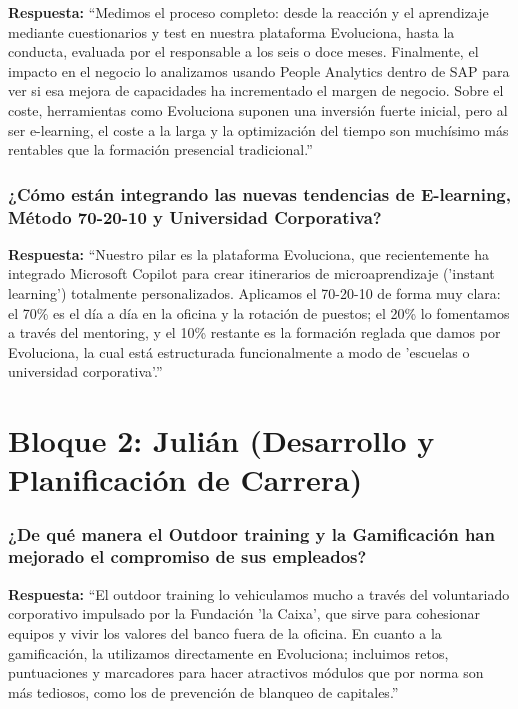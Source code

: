 \textbf{Respuesta:}\newline
``Medimos el proceso completo: desde la reacción y el aprendizaje mediante cuestionarios y test en nuestra plataforma Evoluciona, hasta la conducta, evaluada por el responsable a los seis o doce meses. Finalmente, el impacto en el negocio lo analizamos usando People Analytics dentro de SAP para ver si esa mejora de capacidades ha incrementado el margen de negocio. Sobre el coste, herramientas como Evoluciona suponen una inversión fuerte inicial, pero al ser e-learning, el coste a la larga y la optimización del tiempo son muchísimo más rentables que la formación presencial tradicional.''

\subsubsection*{¿Cómo están integrando las nuevas tendencias de E-learning, Método 70-20-10 y Universidad Corporativa?}

\textbf{Respuesta:}\newline
``Nuestro pilar es la plataforma Evoluciona, que recientemente ha integrado Microsoft Copilot para crear itinerarios de microaprendizaje ('instant learning') totalmente personalizados. Aplicamos el 70-20-10 de forma muy clara: el 70\% es el día a día en la oficina y la rotación de puestos; el 20\% lo fomentamos a través del mentoring, y el 10\% restante es la formación reglada que damos por Evoluciona, la cual está estructurada funcionalmente a modo de 'escuelas o universidad corporativa'.''

\section{Bloque 2: Julián (Desarrollo y Planificación de Carrera)}

\subsubsection*{¿De qué manera el Outdoor training y la Gamificación han mejorado el compromiso de sus empleados?}

\textbf{Respuesta:}\newline
``El outdoor training lo vehiculamos mucho a través del voluntariado corporativo impulsado por la Fundación 'la Caixa', que sirve para cohesionar equipos y vivir los valores del banco fuera de la oficina. En cuanto a la gamificación, la utilizamos directamente en Evoluciona; incluimos retos, puntuaciones y marcadores para hacer atractivos módulos que por norma son más tediosos, como los de prevención de blanqueo de capitales.''

